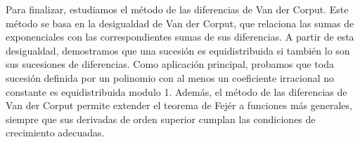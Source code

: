 Para finalizar, estudiamos el método de las diferencias de Van der Corput. Este método se basa en la desigualdad de Van der Corput, que relaciona las sumas de exponenciales con las correspondientes sumas de sus diferencias. A partir de esta desigualdad, demostramos que una sucesión es equidistribuida si también lo son sus sucesiones de diferencias. Como aplicación principal, probamos que toda sucesión definida por un polinomio con al menos un coeficiente irracional no constante es equidistribuida modulo 1. Además, el método de las diferencias de Van der Corput permite extender el teorema de Fejér a funciones más generales, siempre que sus derivadas de orden superior cumplan las condiciones de crecimiento adecuadas.

